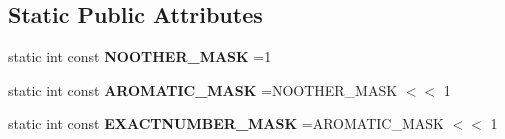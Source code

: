 \subsection*{Static Public Attributes}
\begin{DoxyCompactItemize}
\item 
\hypertarget{class_open_babel_1_1_t_edited_molecule_ae12126ecfe28207e79925c2bbbdc05fd}{static int const {\bfseries N\-O\-O\-T\-H\-E\-R\-\_\-\-M\-A\-S\-K} =1}\label{class_open_babel_1_1_t_edited_molecule_ae12126ecfe28207e79925c2bbbdc05fd}

\item 
\hypertarget{class_open_babel_1_1_t_edited_molecule_afcee871d1d8acab9c1d3ddf9e0e1b7fc}{static int const {\bfseries A\-R\-O\-M\-A\-T\-I\-C\-\_\-\-M\-A\-S\-K} =N\-O\-O\-T\-H\-E\-R\-\_\-\-M\-A\-S\-K $<$$<$ 1}\label{class_open_babel_1_1_t_edited_molecule_afcee871d1d8acab9c1d3ddf9e0e1b7fc}

\item 
\hypertarget{class_open_babel_1_1_t_edited_molecule_afca6524f545e864c554ac279a48f98ce}{static int const {\bfseries E\-X\-A\-C\-T\-N\-U\-M\-B\-E\-R\-\_\-\-M\-A\-S\-K} =A\-R\-O\-M\-A\-T\-I\-C\-\_\-\-M\-A\-S\-K $<$$<$ 1}\label{class_open_babel_1_1_t_edited_molecule_afca6524f545e864c554ac279a48f98ce}

\end{DoxyCompactItemize}

